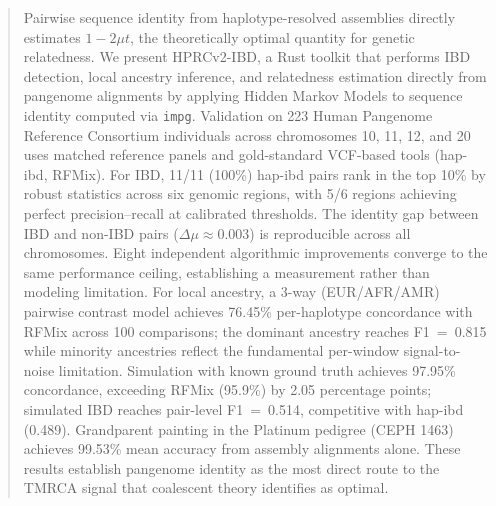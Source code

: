 \begin{abstract}

Pairwise sequence identity from haplotype-resolved assemblies directly estimates $1 - 2\mu t$, the theoretically optimal quantity for genetic relatedness. We present HPRCv2-IBD, a Rust toolkit that performs IBD detection, local ancestry inference, and relatedness estimation directly from pangenome alignments by applying Hidden Markov Models to sequence identity computed via \texttt{impg}. Validation on 223 Human Pangenome Reference Consortium individuals across chromosomes 10, 11, 12, and 20 uses matched reference panels and gold-standard VCF-based tools (hap-ibd, RFMix). For IBD, 11/11 (100\%) hap-ibd pairs rank in the top 10\% by robust statistics across six genomic regions, with 5/6 regions achieving perfect precision--recall at calibrated thresholds. The identity gap between IBD and non-IBD pairs ($\Delta\mu \approx 0.003$) is reproducible across all chromosomes. Eight independent algorithmic improvements converge to the same performance ceiling, establishing a measurement rather than modeling limitation. For local ancestry, a 3-way (EUR/AFR/AMR) pairwise contrast model achieves 76.45\% per-haplotype concordance with RFMix across 100 comparisons; the dominant ancestry reaches F1~=~0.815 while minority ancestries reflect the fundamental per-window signal-to-noise limitation. Simulation with known ground truth achieves 97.95\% concordance, exceeding RFMix (95.9\%) by 2.05 percentage points; simulated IBD reaches pair-level F1~=~0.514, competitive with hap-ibd (0.489). Grandparent painting in the Platinum pedigree (CEPH 1463) achieves 99.53\% mean accuracy from assembly alignments alone. These results establish pangenome identity as the most direct route to the TMRCA signal that coalescent theory identifies as optimal.

\end{abstract}
